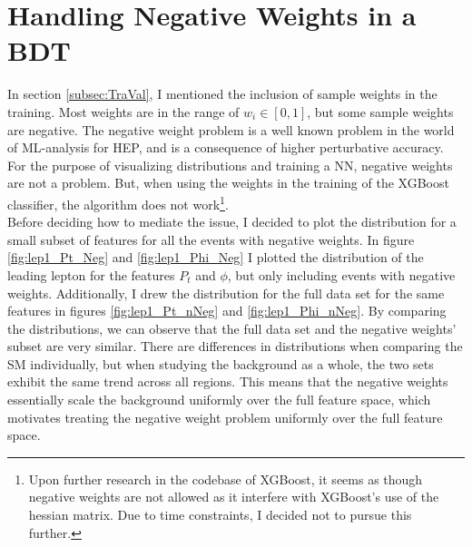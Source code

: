 \section{Handling Negative Weights in a BDT}\label{subsec:negWeights}
In section \ref{subsec:TraVal}, I mentioned the inclusion of sample weights in the training. 
Most weights are in the range of $w_i \in [0,1]$, but some sample weights are negative.
The negative weight problem is a well known problem in the world of \ac{ML}-analysis for \ac{HEP}, 
and is a consequence of higher perturbative accuracy. For the purpose of visualizing 
distributions and training a \ac{NN}, negative weights are not a problem. But, when using 
the weights in the training of the XGBoost classifier, the algorithm does not work\footnote{Upon further research 
in the codebase of XGBoost, it seems as though negative weights are not allowed as it interfere with XGBoost's use 
of the hessian matrix. Due to time constraints, I decided not to  pursue this further.}.  
\\
Before deciding how to mediate the issue, I decided to plot the distribution for 
a small subset of features for all the events with negative weights.
In figure \ref{fig:lep1_Pt_Neg} and \ref{fig:lep1_Phi_Neg} I plotted the distribution of the leading 
lepton for the features $P_t$ and $\phi$, but only including events with negative weights.
Additionally, I drew the distribution for the full data set for the same features in figures \ref{fig:lep1_Pt_nNeg}
and \ref{fig:lep1_Phi_nNeg}. By comparing the distributions, we can observe that the full data set and the 
negative weights' subset are very similar. There are differences in distributions when comparing the \ac{SM} 
individually, but when studying the background as a whole, the two sets exhibit the same trend across all 
regions. This means that the negative weights essentially scale the background uniformly over the full feature 
space, which motivates treating the negative weight problem uniformly over the full feature space.
